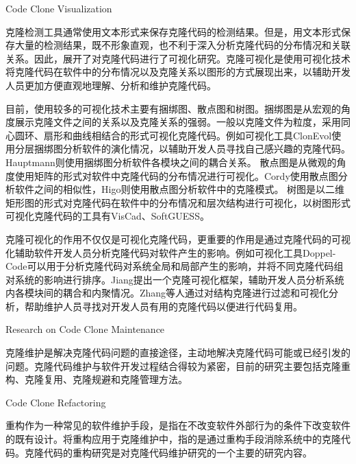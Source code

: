 {Code Clone Visualization}

克隆检测工具通常使用文本形式来保存克隆代码的检测结果。但是，用文本形式保存大量的检测结果，既不形象直观，也不利于深入分析克隆代码的分布情况和关联关系。因此，展开了对克隆代码进行了可视化研究。克隆可视化是使用可视化技术将克隆代码在软件中的分布情况以及克隆关系以图形的方式展现出来，以辅助开发人员更加方便直观地理解、分析和维护克隆代码。

目前，使用较多的可视化技术主要有捆绑图、散点图和树图。捆绑图是从宏观的角度展示克隆文件之间的关系以及克隆关系的强弱。一般以克隆文件为粒度，采用同心圆环、扇形和曲线相结合的形式可视化克隆代码\cite{hanjalic2013clonevol,hauptmann2012using,voinea2014visual}。例如可视化工具ClonEvol使用分层捆绑图分析软件的演化情况，以辅助开发人员寻找自己感兴趣的克隆代码\cite{hanjalic2013clonevol}。Hauptmann则使用捆绑图分析软件各模块之间的耦合关系\cite{hauptmann2012using}。
散点图是从微观的角度使用矩阵的形式对软件中克隆代码的分布情况进行可视化\cite{cordy2011exploring,higo2007method,livieri2007very}。Cordy使用散点图分析软件之间的相似性\cite{cordy2011exploring}，Higo则使用散点图分析软件中的克隆模式\cite{higo2007method,livieri2007very}。
树图是以二维矩形图的形式对克隆代码在软件中的分布情况和层次结构进行可视化，以树图形式可视化克隆代码的工具有VisCad\cite{asaduzzaman2011viscad,uddin2015comprehension}、SoftGUESS\cite{adar2007softguess}。

克隆可视化的作用不仅仅是可视化克隆代码，更重要的作用是通过克隆代码的可视化辅助软件开发人员分析克隆代码对软件产生的影响。例如可视化工具Doppel-Code可以用于分析克隆代码对系统全局和局部产生的影响，并将不同克隆代码组对系统的影响进行排序\cite{forbes2012doppel}。Jiang提出一个克隆可视化框架，辅助开发人员分析系统内各模块间的耦合和内聚情况\cite{jiang2007framework,jiang2006visualizing}。Zhang等人通过对结构克隆进行过滤和可视化分析，帮助维护人员寻找对开发人员有用的克隆代码以便进行代码复用\cite{zhang2008query}。

{Research on Code Clone Maintenance}

克隆维护是解决克隆代码问题的直接途径，主动地解决克隆代码可能或已经引发的问题。克隆代码维护与软件开发过程结合得较为紧密，目前的研究主要包括克隆重构、克隆复用、克隆规避和克隆管理方法。

{Code Clone Refactoring}
\label{ref-clonerefactoring}

重构作为一种常见的软件维护手段，是指在不改变软件外部行为的条件下改变软件的既有设计\cite{kerievsky2006重构与模式}。将重构应用于克隆维护中，指的是通过重构手段消除系统中的克隆代码。克隆代码的重构研究是对克隆代码维护研究的一个主要的研究内容。

